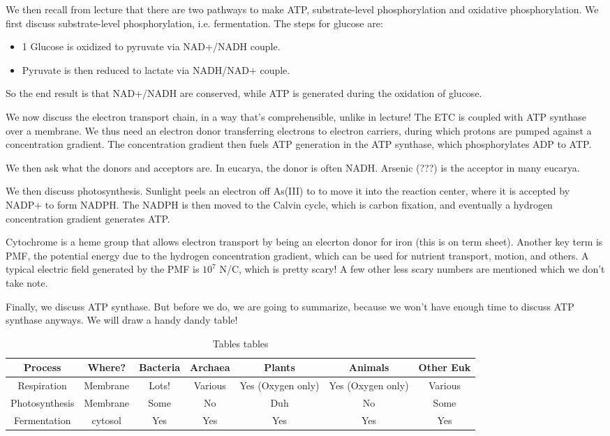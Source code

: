 \documentclass[12pt]{article}
\begin{document}
We then recall from lecture that there are two pathways to make ATP, substrate-level phosphorylation and oxidative phosphorylation. We first discuss substrate-level phosphorylation, i.e. fermentation. The steps for glucose are:
\begin{itemize}
	\item 1 Glucose is oxidized to pyruvate via NAD+/NADH couple.
	\item Pyruvate is then reduced to lactate via NADH/NAD+ couple.
\end{itemize}

So the end result is that NAD+/NADH are conserved, while ATP is generated during the oxidation of glucose. 

We now discuss the electron transport chain, in a way that's comprehensible, unlike in lecture! The ETC is coupled with ATP synthase over a membrane. We thus need an electron donor transferring electrons to electron carriers, during which protons are pumped against a concentration gradient. The concentration gradient then fuels ATP generation in the ATP synthase, which phosphorylates ADP to ATP. 

We then ask what the donors and acceptors are. In eucarya, the donor is often NADH. Arsenic (???) is the acceptor in many eucarya.

We then discuss photosynthesis. Sunlight peels an electron off As(III) to to move it into the reaction center, where it is accepted by NADP+ to form NADPH. The NADPH is then moved to the Calvin cycle, which is carbon fixation, and eventually a hydrogen concentration gradient generates ATP. 

Cytochrome is a heme group that allows electron transport by being an elecrton donor for iron (this is on term sheet). Another key term is PMF, the potential energy due to the hydrogen concentration gradient, which can be used for nutrient transport, motion, and others. A typical electric field generated by the PMF is $10^7$ N/C, which is pretty scary! A few other less scary numbers are mentioned which we don't take note.

Finally, we discuss ATP synthase. But before we do, we are going to summarize, because we won't have enough time to discuss ATP synthase anyways. We will draw a handy dandy table!
\begin{table}[!h]
	\centering
	\begin{tabular}{|c|c|c|c|c|c|c|}
		\hline
		Process & Where? & Bacteria & Archaea & Plants & Animals & Other Euk\\\hline
		Respiration & Membrane & Lots! & Various & Yes (Oxygen only) & Yes (Oxygen only) & Various\\\hline
		Photosynthesis & Membrane & Some & No & Duh & No & Some\\\hline
		Fermentation & cytosol & Yes & Yes & Yes & Yes & Yes\\\hline
	\end{tabular}
	\caption{Tables tables}
\end{table}
\end{document}
